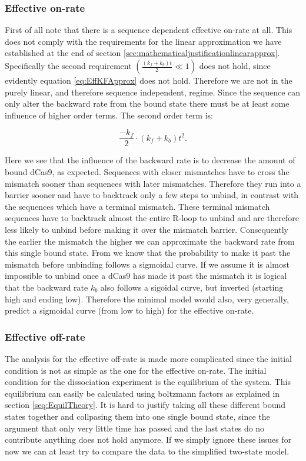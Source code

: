 \subsubsection{Effective on-rate}

First of all note that there is a sequence dependent effective on-rate at all. This does not comply with the requirements for the linear approximation we have established at the end of section \ref{sec:mathematicaljustificationlinearapprox}. Specifically the second requirement $\left( \frac{(k_f+k_b)t}{2} \ll 1 \right)$ does not hold, since evidently equation \ref{eq:EffKFApprox} does not hold. Therefore we are not in the purely linear, and therefore sequence independent, regime. Since the sequence can only alter the backward rate from the bound state there must be at least some influence of higher order terms. The second order term is:

\begin{equation}
\frac{-k_f}{2} \cdot (k_f+k_b)t^2.
\end{equation}

Here we see that the influence of the backward rate is to decrease the amount of bound dCas9, as expected. Sequences with closer mismatches have to cross the mismatch sooner than sequences with later mismatches. Therefore they run into a barrier sooner and have to backtrack only a few steps to unbind, in contrast with the sequences which have a terminal mismatch. These terminal mismatch sequences have to backtrack almost the entire R-loop to unbind and are therefore less likely to unbind before making it over the mismatch barrier. Consequently the earlier the mismatch the higher we can approximate the backward rate from this single bound state. From \cite{Misha} we know that the probability to make it past the mismatch before unbinding follows a sigmoidal curve. If we assume it is almost impossible to unbind once a dCas9 has made it past the mismatch it is logical that the backward rate $k_b$ also follows a sigoidal curve, but inverted (starting high and ending low). Therefore the minimal model would also, very generally, predict a sigmoidal curve (from low to high) for the effective on-rate.

\subsubsection{Effective off-rate}

The analysis for the effective off-rate is made more complicated since the initial condition is not as simple as the one for the effective on-rate. The initial condition for the dissociation experiment is the equilibrium of the system. This equilibrium can easily be calculated using boltzmann factors as explained in section \ref{seq:EquilTheory}. It is hard to justify taking all these different bound states together and collpasing them into one single bound state, since the argument that only very little time has passed and the last states do no contribute anything does not hold anymore. If we simply ignore these issues for now we can at least try to compare the data to the simplified two-state model.

